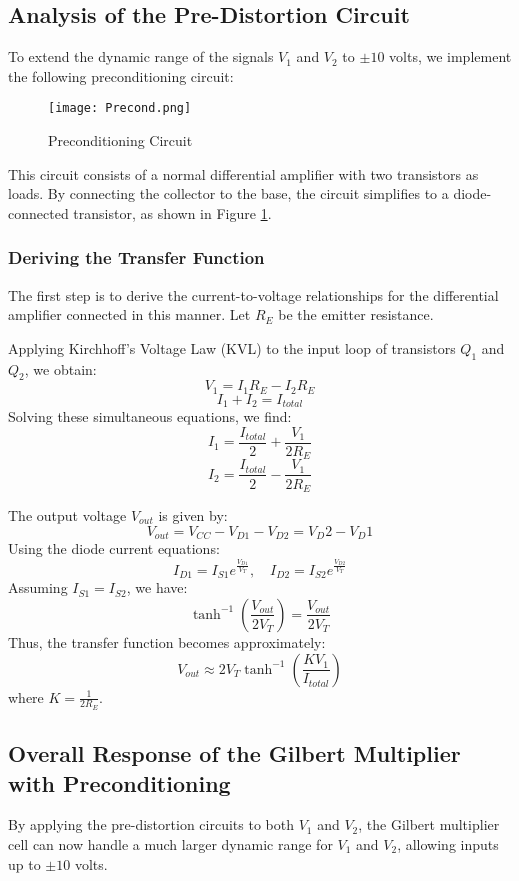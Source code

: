 \documentclass[a4paper,9pt,twoside,openany,twocolumn]{memoir}
\begin{document}
\subsection{Analysis of the Pre-Distortion Circuit}
To extend the dynamic range of the signals \( V_1 \) and \( V_2 \) to \( \pm10 \) volts, we implement the following preconditioning circuit:
\begin{figure}[h]
    \centering
\texttt{[image: Precond.png]}
    \caption{Preconditioning Circuit}
    \label{fig:preconditioning}
\end{figure}
This circuit consists of a normal differential amplifier with two transistors as loads. By connecting the collector to the base, the circuit simplifies to a diode-connected transistor, as shown in Figure \ref{fig:preconditioning}. 

\subsubsection{Deriving the Transfer Function}
The first step is to derive the current-to-voltage relationships for the differential amplifier connected in this manner. Let \( R_E \) be the emitter resistance.

Applying Kirchhoff's Voltage Law (KVL) to the input loop of transistors \( Q_1 \) and \( Q_2 \), we obtain:
\[
V_1 = I_1 R_E - I_2 R_E
\]
\[
I_1 + I_2 = I_{total}
\]
Solving these simultaneous equations, we find:
\[
I_1 = \frac{I_{total}}{2} + \frac{V_1}{2R_E}
\]
\[
I_2 = \frac{I_{total}}{2} - \frac{V_1}{2R_E}
\]

The output voltage \( V_{out} \) is given by:
\[
V_{out} = V_{CC} - V_{D1} - V_{D2} = V_D2 - V_D1
\]
Using the diode current equations:
\[
I_{D1} = I_{S1} e^{\frac{V_{D1}}{V_T}}, \quad I_{D2} = I_{S2} e^{\frac{V_{D2}}{V_T}}
\]
Assuming \( I_{S1} = I_{S2} \), we have:
\[
\tanh^{-1}\left(\frac{V_{out}}{2V_T}\right) = \frac{V_{out}}{2V_T}
\]
Thus, the transfer function becomes approximately:
\[
V_{out} \approx 2V_T \tanh^{-1}\left(\frac{K V_1}{I_{total}}\right)
\]
where \( K = \frac{1}{2R_E} \).

\subsection{Overall Response of the Gilbert Multiplier with Preconditioning}
By applying the pre-distortion circuits to both \( V_1 \) and \( V_2 \), the Gilbert multiplier cell can now handle a much larger dynamic range for \( V_1 \) and \( V_2 \), allowing inputs up to \( \pm10 \) volts.
\end{document}

